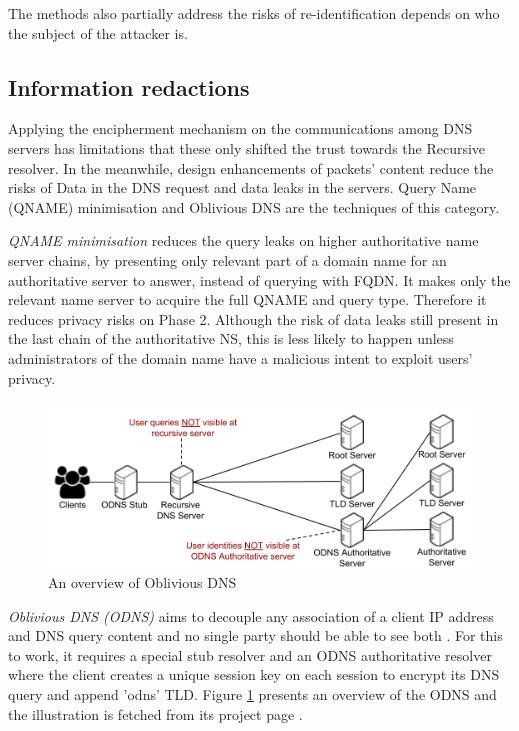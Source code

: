 The methods also partially address the risks of re-identification depends on who the subject of the attacker is.

\subsection{Information redactions}
Applying the encipherment mechanism on the communications among DNS servers has limitations that these only shifted the trust towards the Recursive resolver.
In the meanwhile, design enhancements of packets' content reduce the risks of Data in the DNS request and data leaks in the servers.
Query Name (QNAME) minimisation \cite{bortzmeyer2016dns} and Oblivious DNS \cite{annee-dprive-oblivious-dns-00} are the techniques of this category.

\textit{QNAME minimisation} reduces the query leaks on higher authoritative name server chains, by presenting only relevant part of a domain name for an authoritative server to answer, instead of querying with FQDN.
It makes only the relevant name server to acquire the full QNAME and query type. Therefore it reduces privacy risks on Phase 2.
Although the risk of data leaks still present in the last chain of the authoritative NS, this is less likely to happen unless administrators of the domain name have a malicious intent to exploit users' privacy.

\begin{figure}[h!]
    \begin{center}
    \includegraphics*[width=0.9\columnwidth]{img/ODNSoverview}
    \end{center}
    \caption{An overview of Oblivious DNS \cite{ODNSwebsite}}
    \label{odnsoverview}
\end{figure}
\textit{Oblivious DNS (ODNS)} aims to decouple any association of a client IP address and DNS query content and no single party should be able to see both \cite{annee-dprive-oblivious-dns-00}.
For this to work, it requires a special stub resolver and an ODNS authoritative resolver where the client creates a unique session key on each session to encrypt its DNS query and append 'odns' TLD.
Figure \ref{odnsoverview} presents an overview of the ODNS and the illustration is fetched from its project page \cite{ODNSwebsite}.

